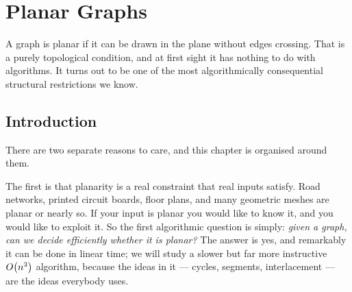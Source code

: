 
\chapter{Planar Graphs}
\label{ch:planar}

A graph is planar if it can be drawn in the plane without edges crossing.
That is a purely topological condition, and at first sight it has nothing to
do with algorithms. It turns out to be one of the most algorithmically
consequential structural restrictions we know.

\begin{goals}
\end{goals}

\section{Introduction}

There are two separate reasons to care, and this chapter is organised around
them.

The first is that planarity is a real constraint that real inputs satisfy.
Road networks, printed circuit boards, floor plans, and many geometric meshes
are planar or nearly so. If your input is planar you would like to know it,
and you would like to exploit it. So the first algorithmic question is simply:
\emph{given a graph, can we decide efficiently whether it is planar?} The
answer is yes, and remarkably it can be done in linear time; we will study a
slower but far more instructive $O\!\left(n^3\right)$ algorithm, because the ideas in
it --- cycles, segments, interlacement --- are the ideas everybody uses.

